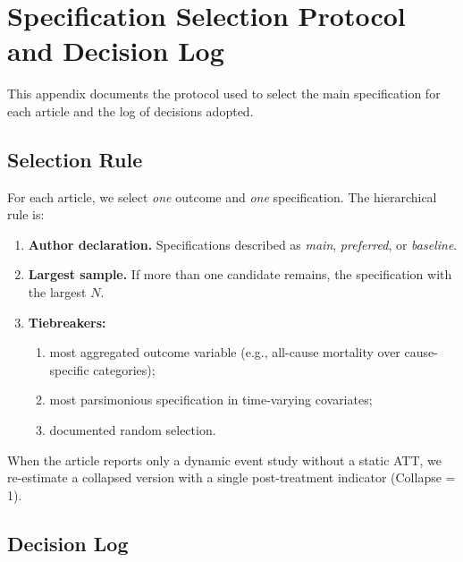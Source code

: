 \chapter{Specification Selection Protocol and Decision Log}
\label{AppendixA}

This appendix documents the protocol used to select the main specification for each article and the log of decisions adopted.

\section{Selection Rule}

For each article, we select \emph{one} outcome and \emph{one} specification. The hierarchical rule is:

\begin{enumerate}[label=\roman*.]
  \item \textbf{Author declaration.} Specifications described as \emph{main}, \emph{preferred}, or \emph{baseline}.
  \item \textbf{Largest sample.} If more than one candidate remains, the specification with the largest $N$.
  \item \textbf{Tiebreakers:}
    \begin{enumerate}[label=(\alph*)]
      \item most aggregated outcome variable (e.g., all-cause mortality over cause-specific categories);
      \item most parsimonious specification in time-varying covariates;
      \item documented random selection.
    \end{enumerate}
\end{enumerate}

When the article reports only a dynamic event study without a static ATT, we re-estimate a collapsed version with a single post-treatment indicator (Collapse = 1).

\newpage
\section{Decision Log}

